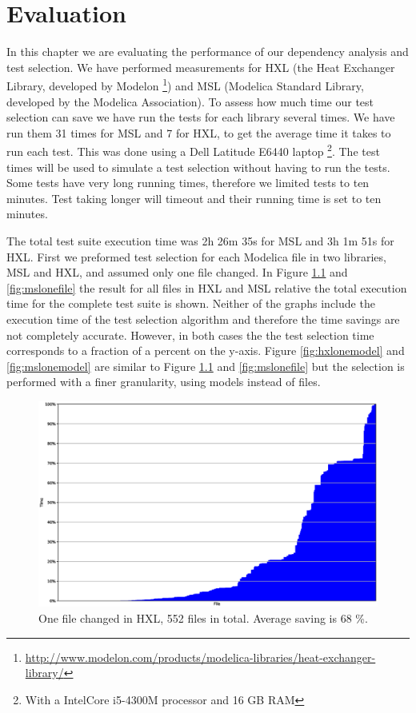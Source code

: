 \documentclass{cslthse-msc}
\begin{document}
\chapter[Evaluation]{Evaluation}
In this chapter we are evaluating the performance of our dependency analysis and test selection. We have performed measurements for HXL (the Heat Exchanger Library, developed by Modelon \footnote{\url{http://www.modelon.com/products/modelica-libraries/heat-exchanger-library/}}) and MSL (Modelica Standard Library, developed by the Modelica Association). To assess how much time our test selection can save we have run the tests for each library several times. We have run them 31 times for MSL and 7 for HXL, to get the average time it takes to run each test. This was done using a Dell Latitude E6440 laptop \footnote{With a Intel\textregistered Core \texttrademark i5-4300M processor and 16 GB RAM}. The test times will be used to simulate a test selection without having to run the tests. Some tests have very long running times, therefore we limited tests to ten minutes. Test taking longer will timeout and their running time is set to ten minutes.

The total test suite execution time was 2h 26m 35s for MSL and 3h 1m 51s for HXL. First we preformed test selection for each Modelica file in two libraries, MSL and HXL, and assumed only one file changed.  In Figure \ref{fig:hxlonefile} and \ref{fig:mslonefile} the result for all files in HXL and MSL relative the total execution time for the complete test suite is shown. Neither of the graphs include the execution time of the test selection algorithm and therefore the time savings are not completely accurate. However, in both cases the the test selection time corresponds to a fraction of a percent on the y-axis. Figure \ref{fig:hxlonemodel} and \ref{fig:mslonemodel} are similar to Figure \ref{fig:hxlonefile} and \ref{fig:mslonefile} but the selection is performed with a finer granularity, using models instead of files. 

\begin{figure}[!htbp]
    \centering
    \includegraphics[width=\textwidth]{Graphs/HXL_one_file.eps}
    \caption{One file changed in HXL, 552 files in total. Average saving is 68 \%.}
    \label{fig:hxlonefile}
\end{figure}
\end{document}
